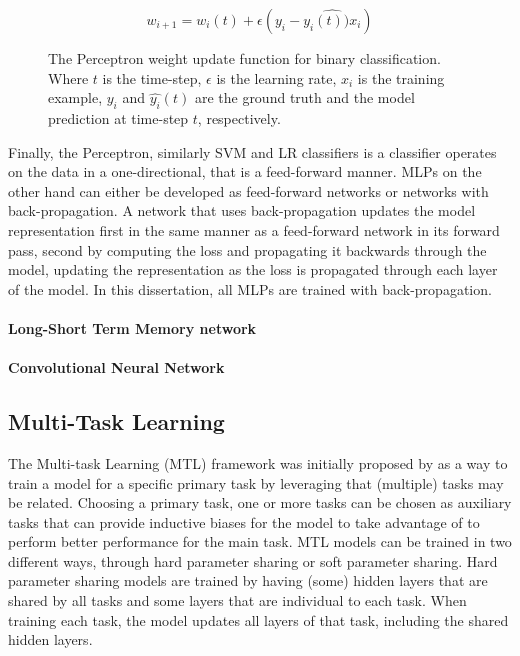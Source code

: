 \begin{figure}[h]
  \begin{equation}\label{eq:perceptron_update}
    w_{i+1} = w_i(t) + \epsilon (y_i - \hat{y_i(t))x_{i}})
  \end{equation}
  \caption[The Perceptron weight update function.]{The Perceptron weight update function for binary classification. Where $t$ is the time-step, $\epsilon$ is the learning rate, $x_i$ is the training example, $y_i$ and $\hat{y_i}(t)$ are the ground truth and the model prediction at time-step $t$, respectively.}
\end{figure}

Finally, the Perceptron, similarly SVM and LR classifiers is a classifier operates on the data in a one-directional, that is a feed-forward manner. MLPs on the other hand can either be developed as feed-forward networks or networks with back-propagation.
A network that uses back-propagation updates the model representation first in the same manner as a feed-forward network in its forward pass, second by computing the loss and propagating it backwards through the model, updating the representation as the loss is propagated through each layer of the model.
In this dissertation, all MLPs are trained with back-propagation.

\paragraph{Long-Short Term Memory network}

\paragraph{Convolutional Neural Network}


\subsection{Multi-Task Learning}
The Multi-task Learning (MTL) framework was initially proposed by \citet{Caruana:1993} as a way to train a model for a specific primary task by leveraging that (multiple) tasks may be related. 
Choosing a primary task, one or more tasks can be chosen as auxiliary tasks that can provide inductive biases for the model to take advantage of to perform better performance for the main task.
MTL models can be trained in two different ways, through hard parameter sharing or soft parameter sharing.
Hard parameter sharing models are trained by having (some) hidden layers that are shared by all tasks and some layers that are individual to each task.
When training each task, the model updates all layers of that task, including the shared hidden layers.

